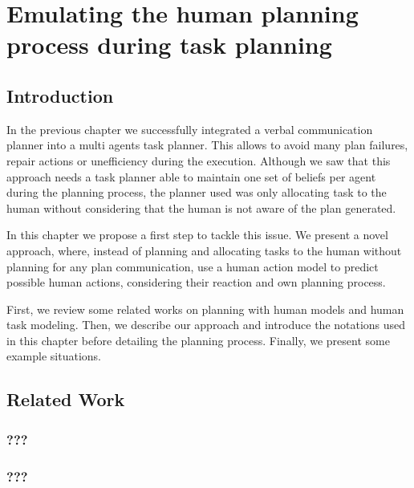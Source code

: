 \documentclass[a4paper,11pt,twoside]{StyleThese}
\begin{document}
\setcounter{chapter}{3} %
\dominitoc
\faketableofcontents
\fi

\chapter{Emulating the human planning process during task planning}
\minitoc

\section{Introduction}
In the previous chapter we successfully integrated a verbal communication planner into a multi agents task planner. This allows to avoid many plan failures, repair actions or unefficiency during the execution. Although we saw that this approach needs a task planner able to maintain one set of beliefs per agent during the planning process, the planner used was only allocating task to the human without considering that the human is not aware of the plan generated.

In this chapter we propose a first step to tackle this issue. We present a novel approach, where, instead of planning and allocating tasks to the human without planning for any plan communication, use a human action model to predict possible human actions, considering their reaction and own planning process.

First, we review some related works on planning with human models and human task modeling. Then, we describe our approach and introduce the notations used in this chapter before detailing the planning process. Finally, we present some example situations.


\section{Related Work}
\subsection{???}

\subsection{???}
\end{document}
